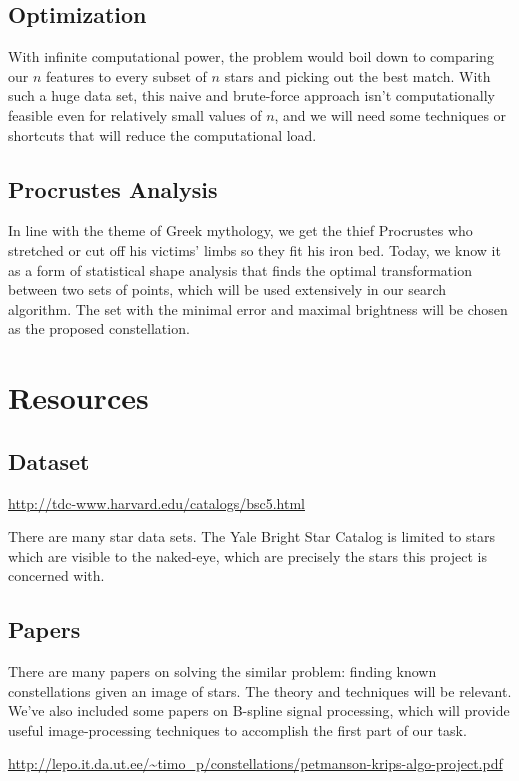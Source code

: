 \documentclass{article}
\begin{document}
\subsection{Optimization}
With infinite computational power, the problem would boil down to comparing our $n$ features to every subset of $n$ stars and picking out the best match. With such a huge data set, this naive and brute-force approach isn't computationally feasible even for relatively small values of $n$, and we will need some techniques or shortcuts that will reduce the computational load.
\subsection{Procrustes Analysis}
In line with the theme of Greek mythology, we get the thief Procrustes who stretched or cut off his victims' limbs so they fit his iron bed. Today, we know it as a form of statistical shape analysis that finds the optimal transformation between two sets of points, which will be used extensively in our search algorithm. The set with the minimal error and maximal brightness will be chosen as the proposed constellation.


\section{Resources}


\subsection{Dataset}
\url{http://tdc-www.harvard.edu/catalogs/bsc5.html}

There are many star data sets. The Yale Bright Star Catalog is limited to stars which are visible to the naked-eye, which are precisely the stars this project is concerned with.

\subsection{Papers}
There are many papers on solving the similar problem: finding known constellations given an image of stars. The theory and techniques will be relevant. We've also included some papers on B-spline signal processing, which will provide useful image-processing techniques to accomplish the first part of our task.

\url{http://lepo.it.da.ut.ee/~timo_p/constellations/petmanson-krips-algo-project.pdf}
\end{document}

